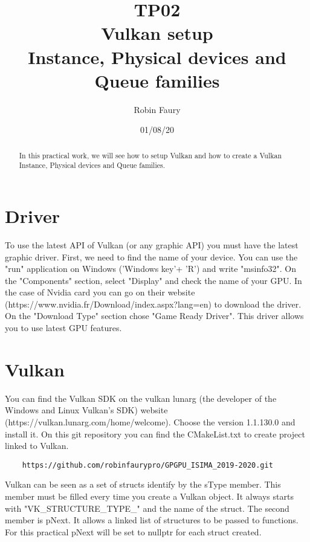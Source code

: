 \documentclass{article}
\begin{document}
\title{TP02\\Vulkan setup\\Instance, Physical devices and Queue families}
\author{Robin Faury}
\date{01/08/20}
\maketitle

\begin{abstract}
	In this practical work, we will see how to setup Vulkan and how to create a Vulkan Instance, Physical devices and Queue families.
\end{abstract}

\section{Driver}
To use the latest API of Vulkan (or any graphic API) you must have the latest graphic driver. First, we need to find the name of your device. You can use the "run" application on Windows ('Windows key'+ 'R') and write "msinfo32". On the "Components" section, select "Display" and check the name of your GPU. In the case of Nvidia card you can go on their website (https://www.nvidia.fr/Download/index.aspx?lang=en) to download the driver. On the "Download Type" section chose "Game Ready Driver". This driver allows you to use latest GPU features.

\section{Vulkan}
You can find the Vulkan SDK on the vulkan lunarg (the developer of the Windows and Linux Vulkan's SDK) website (https://vulkan.lunarg.com/home/welcome). Choose the version 1.1.130.0 and install it.
On this git repository you can find the CMakeList.txt to create project linked to Vulkan.
\begin{lstlisting}
	https://github.com/robinfaurypro/GPGPU_ISIMA_2019-2020.git
\end{lstlisting}
Vulkan can be seen as a set of structs identify by the sType member. This member must be filled every time you create a Vulkan object. It always starts with "VK\_STRUCTURE\_TYPE\_" and the name of the struct. The second member is pNext. It allows a linked list of structures to be passed to functions. For this practical pNext will be set to nullptr for each struct created.

\newpage
\end{document}
